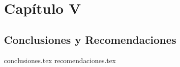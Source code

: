 \chapter{Capítulo V}
\section{Conclusiones y Recomendaciones}
{conclusiones.tex}
{recomendaciones.tex}
